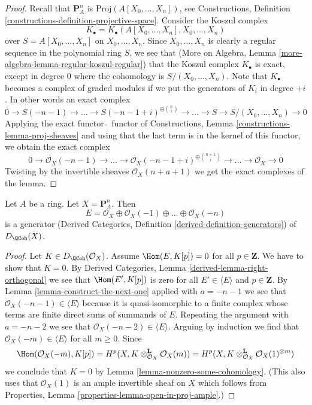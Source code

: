 \begin{proof}
Recall that $\mathbf{P}^n_A$ is $\text{Proj}(A[X_0, \ldots, X_n])$, see
Constructions, Definition \ref{constructions-definition-projective-space}.
Consider the Koszul complex
$$
K_\bullet = K_\bullet(A[X_0, \ldots, X_n], X_0, \ldots, X_n)
$$
over $S = A[X_0, \ldots, X_n]$ on $X_0, \ldots, X_n$.
Since $X_0, \ldots, X_n$ is clearly a regular sequence in the
polynomial ring $S$, we see that
(More on Algebra, Lemma \ref{more-algebra-lemma-regular-koszul-regular})
that the Koszul complex $K_\bullet$ is exact, except in degree $0$
where the cohomology is $S/(X_0, \ldots, X_n)$.
Note that $K_\bullet$ becomes a complex of graded modules if we
put the generators of $K_i$ in degree $+i$. In other words an
exact complex
$$
0 \to S(-n - 1) \to \ldots \to S(-n - 1 + i)^{\oplus {n \choose i}} \to \ldots
\to S \to S/(X_0, \ldots, X_n) \to 0
$$
Applying the exact functor $\tilde{\ }$ functor of Constructions, 
Lemma \ref{constructions-lemma-proj-sheaves} and using that
the last term is in the kernel of this functor,
we obtain the exact complex
$$
0 \to \mathcal{O}_X(-n - 1) \to \ldots
\to \mathcal{O}_X(-n - 1 + i)^{\oplus {n + 1 \choose i}} \to
\ldots \to \mathcal{O}_X \to 0
$$
Twisting by the invertible sheaves $\mathcal{O}_X(n + a + 1)$
we get the exact complexes of the lemma.
\end{proof}

\begin{lemma}
\label{lemma-generator-P1}
Let $A$ be a ring. Let $X = \mathbf{P}^n_A$. Then
$$
E =
\mathcal{O}_X \oplus \mathcal{O}_X(-1) \oplus \ldots \oplus \mathcal{O}_X(-n)
$$
is a generator
(Derived Categories, Definition \ref{derived-definition-generators})
of $D_\QCoh(X)$.
\end{lemma}

\begin{proof}
Let $K \in D_\QCoh(\mathcal{O}_X)$. Assume
$\Hom(E, K[p]) = 0$ for all $p \in \mathbf{Z}$.
We have to show that $K = 0$.
By Derived Categories, Lemma
\ref{derived-lemma-right-orthogonal}
we see that $\Hom(E', K[p])$ is zero for all $E' \in \langle E \rangle$
and $p \in \mathbf{Z}$.
By Lemma \ref{lemma-construct-the-next-one}
applied with $a = -n - 1$
we see that $\mathcal{O}_X(-n - 1) \in \langle E \rangle$
because it is quasi-isomorphic to a finite complex
whose terms are finite direct sums of summands of $E$.
Repeating the argument with $a = -n - 2$ we see that
$\mathcal{O}_X(-n - 2) \in \langle E \rangle$.
Arguing by induction we find that $\mathcal{O}_X(-m) \in \langle E \rangle$
for all $m \geq 0$.
Since
$$
\Hom(\mathcal{O}_X(-m), K[p]) =
H^p(X, K \otimes_{\mathcal{O}_X}^\mathbf{L} \mathcal{O}_X(m)) =
H^p(X, K \otimes_{\mathcal{O}_X}^\mathbf{L} \mathcal{O}_X(1)^{\otimes m})
$$
we conclude that $K = 0$ by Lemma \ref{lemma-nonzero-some-cohomology}.
(This also uses that $\mathcal{O}_X(1)$ is an ample
invertible sheaf on $X$ which follows from
Properties, Lemma \ref{properties-lemma-open-in-proj-ample}.)
\end{proof}

